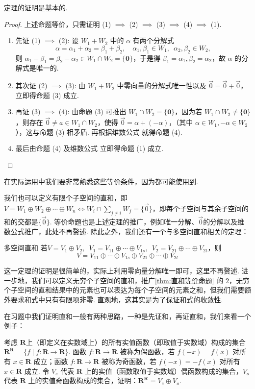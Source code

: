 定理的证明是基本的.
\begin{proof}
    上述命题等价，只需证明 (1) $\implies$ (2) $\implies$ (3) $\implies$ (4) $\implies$ (1).
    \begin{enumerate}
        \item 先证 (1) $\implies$ (2): 设 $W_1 + W_2$ 中的 $\alpha$ 有两个分解式
        \[
            \alpha = \alpha_1 + \alpha_2 = \beta_1 + \beta_2, \quad \alpha_1, \beta_1 \in W_1, \enspace \alpha_2, \beta_2 \in W_2,
        \]
        则 $\alpha_1 - \beta_1 = \beta_2 - \alpha_2 \in W_1 \cap W_2 = \{\mathbf{0}\}$，于是得 $\beta_1 = \alpha_1, \beta_2 = \alpha_2$，故 $\alpha$ 的分解式是唯一的.
        \item 其次证 (2) $\implies$ (3): 由 $W_1 + W_2$ 中零向量的分解式唯一性以及 $\vec{0} = \vec{0} + \vec{0}$，立即得命题 (3) 成立.
        \item 再证 (3) $\implies$ (4): 由命题 (3) 可推出 $W_1 \cap W_2 = \{\mathbf{0}\}$，因为若 $W_1 \cap W_2 \ne \{\mathbf{0}\}$，则存在 $\vec{0} \ne a \in W_1 \cap W_2$，使得 $\vec{0} = \alpha + (-\alpha)$，（其中 $\alpha \in W_1, -\alpha \in W_2$），这与命题 (3) 相矛盾. 再根据维数公式 就得命题 (4).
        \item 最后由命题 (4) 及维数公式 立即得命题 (1) 成立.
    \end{enumerate}
\end{proof}
在实际运用中我们要非常熟悉这些等价条件，因为都可能使用到.

我们也可以定义有限个子空间的直和，即$V=W_1\oplus W_2\oplus\cdots\oplus W_n \iff W_i \cap \sum\limits_{j \neq i}W_j=\{\vec{0}\}$，即每个子空间与其余子空间的和的交都是$\{\vec{0}\}$. 等价命题也是上述定理的推广，例如唯一分解、$\vec{0}$的分解以及维数公式推广，此处不再赘述. 除此之外，我们还有一个与多空间直和相关的定理：
\begin{theorem}{}{多空间直和}
    若$V=V_1\oplus V_2,\enspace V_1=V_{11}\oplus\cdots\oplus V_{1s},\enspace V_2=V_{21}\oplus\cdots\oplus V_{2t}$，则
    \[V=V_{11}\oplus\cdots\oplus V_{1s}\oplus V_{21}\oplus\cdots\oplus V_{2t}\]
\end{theorem}
这一定理的证明是很简单的，实际上利用零向量分解唯一即可，这里不再赘述. 进一步地，我们可以定义无穷个子空间的直和，推广\autoref{thm:直和等价命题} 的 $2$，无穷个子空间的直和结果中的元素也可以表达为每个子空间的元素之和，但我们需要额外要求和式中只有有限项非零. 直观地，这其实是为了保证和式的收敛性.

在习题中我们证明直和一般有两种思路，一种是先证和，再证直和，我们来看一个例子：
\begin{example}{}{}
    考虑 $\mathbf{R}$上（即定义在实数域上）的所有实值函数（即取值于实数域）构成的集合 $\mathbf{R}^\mathbf{R} = \{f \mid f: \mathbf{R} \to \mathbf{R}\}$.  函数 $f: \mathbf{R} \to \mathbf{R}$ 被称为偶函数，若 $f(-x) = f(x)$ 对所有 $x \in \mathbf{R}$ 成立；函数 $f: \mathbf{R} \to \mathbf{R}$ 被称为奇函数，若 $f(-x) = -f(x)$ 对所有 $x \in \mathbf{R}$ 成立. 令 $V_e$ 代表 $\mathbf{R}$ 上的实值（函数取值于实数域）偶函数构成的集合，$V_o$ 代表 $\mathbf{R}$ 上的实值奇函数构成的集合，证明：$\mathbf{R}^\mathbf{R} = V_e \oplus V_o$.
\end{example}

